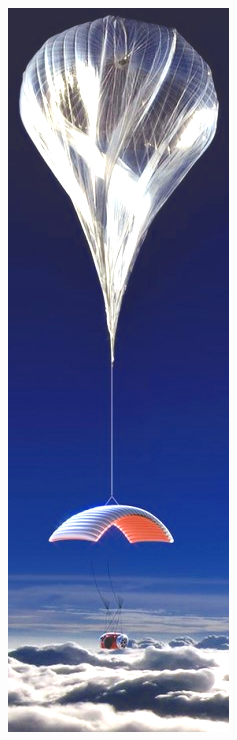 \begin{mylist}
\begin{minipage}{0.1\textwidth}
 	\includegraphics[width=\textwidth]{img-08/globo-sonda}
 \end{minipage}
 

\end{mylist}
